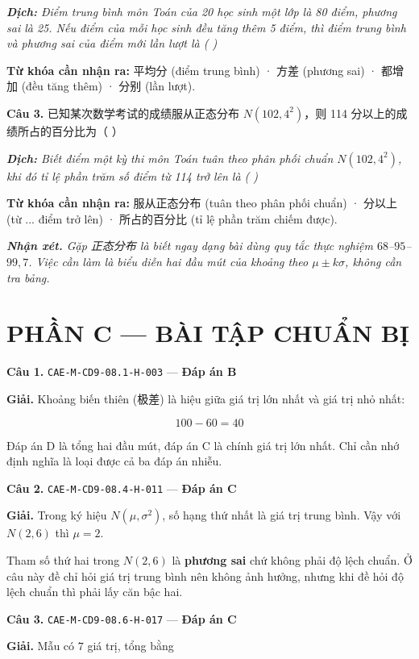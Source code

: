 \documentclass[11pt, a4paper]{article}
\begin{document}
\noindent\emph{\textbf{Dịch:} Điểm trung bình môn Toán của 20 học sinh một lớp là 80 điểm, phương sai là 25. Nếu điểm của mỗi học sinh đều tăng thêm 5 điểm, thì điểm trung bình và phương sai của điểm mới lần lượt là ( )}

\textbf{Từ khóa cần nhận ra:} 平均分 (điểm trung bình) · 方差 (phương sai) · 都增加 (đều tăng thêm) · 分别 (lần lượt).

\textbf{Câu 3.} 已知某次数学考试的成绩服从正态分布 $N(102, 4^2)$，则 114 分以上的成绩所占的百分比为（ ）

\noindent\emph{\textbf{Dịch:} Biết điểm một kỳ thi môn Toán tuân theo phân phối chuẩn $N(102, 4^2)$, khi đó tỉ lệ phần trăm số điểm từ 114 trở lên là ( )}

\textbf{Từ khóa cần nhận ra:} 服从正态分布 (tuân theo phân phối chuẩn) · 分以上 (từ ... điểm trở lên) · 所占的百分比 (tỉ lệ phần trăm chiếm được).

\noindent\emph{\textbf{Nhận xét.} Gặp 正态分布 là biết ngay dạng bài dùng quy tắc thực nghiệm $68$–$95$–$99,7$. Việc cần làm là biểu diễn hai đầu mút của khoảng theo $\mu \pm k\sigma$, không cần tra bảng.}

\section{PHẦN C — BÀI TẬP CHUẨN BỊ}

\textbf{Câu 1.} \texttt{CAE-M-CD9-08.1-H-003} — \textbf{Đáp án B}

\textbf{Giải.} Khoảng biến thiên (极差) là hiệu giữa giá trị lớn nhất và giá trị nhỏ nhất:

$$100 - 60 = 40$$

 Đáp án D là tổng hai đầu mút, đáp án C là chính giá trị lớn nhất. Chỉ cần nhớ định nghĩa là loại được cả ba đáp án nhiễu.

\textbf{Câu 2.} \texttt{CAE-M-CD9-08.4-H-011} — \textbf{Đáp án C}

\textbf{Giải.} Trong ký hiệu $N(\mu, \sigma^2)$, số hạng thứ nhất là giá trị trung bình. Vậy với $N(2, 6)$ thì $\mu = 2$.

 Tham số thứ hai trong $N(2, 6)$ là \textbf{phương sai} chứ không phải độ lệch chuẩn. Ở câu này đề chỉ hỏi giá trị trung bình nên không ảnh hưởng, nhưng khi đề hỏi độ lệch chuẩn thì phải lấy căn bậc hai.

\textbf{Câu 3.} \texttt{CAE-M-CD9-08.6-H-017} — \textbf{Đáp án C}

\textbf{Giải.} Mẫu có $7$ giá trị, tổng bằng
\end{document}
